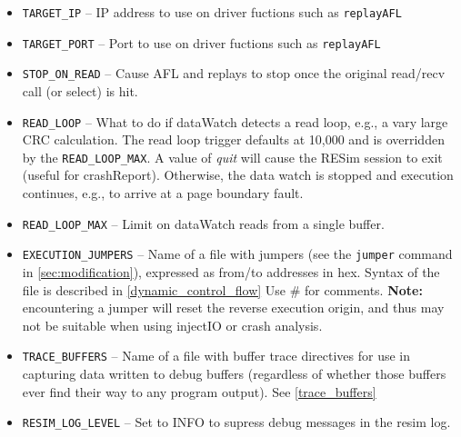 \documentclass[titlepage]{article}
\begin{document}
\begin{itemize}
\item {\tt TARGET\_IP} -- IP address to use on driver fuctions such as {\tt replayAFL}
\item {\tt TARGET\_PORT} -- Port to use on driver fuctions such as {\tt replayAFL}
\item {\tt STOP\_ON\_READ} -- Cause AFL and replays to stop once the original read/recv call (or select) is hit.
\item {\tt READ\_LOOP} -- What to do if dataWatch detects a read loop, e.g., a vary large CRC calculation.  The read loop trigger defaults at 10,000
and is overridden by the {\tt READ\_LOOP\_MAX}.  A value of \textit{quit} will cause
the RESim session to exit (useful for crashReport).  Otherwise, the data watch is stopped and execution continues, e.g., to arrive at a page boundary fault.
\item {\tt READ\_LOOP\_MAX} -- Limit on dataWatch reads from a single buffer.
\item {\tt EXECUTION\_JUMPERS} -- Name of a file with jumpers (see the {\tt jumper} command in \ref{sec:modification}), expressed as 
from/to addresses in hex.  Syntax of the file is described in \ref{dynamic_control_flow}  Use \# for comments.  \textbf{Note:} encountering
a jumper will reset the reverse execution origin, and thus may not be suitable when using injectIO or crash analysis.
\item {\tt TRACE\_BUFFERS} -- Name of a file with buffer trace directives for use in capturing data written to debug buffers (regardless of whether those
buffers ever find their way to any program output). See \ref{trace_buffers}
\item {\tt RESIM\_LOG\_LEVEL} -- Set to INFO to supress debug messages in the resim log.

\end{itemize}
\end{document}
